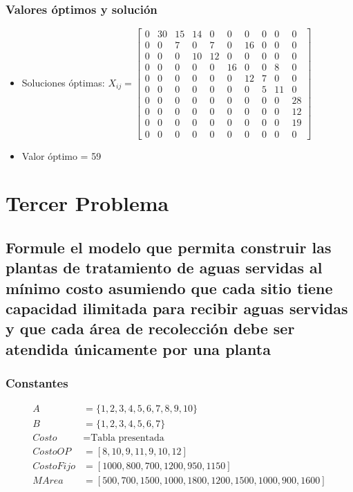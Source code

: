 \documentclass[a4paper,12pt]{article}
\begin{document}
\subsubsection{Valores óptimos y solución}
\begin{itemize}
	\item Soluciones óptimas: $X_{ij}=
	\begin{bmatrix}
		0 & 30 & 15 & 14 & 0 & 0 & 0 & 0 & 0 & 0\\
		0 & 0 & 7 & 0 & 7 & 0 & 16 & 0 & 0 & 0\\
		0 & 0 & 0 & 10 & 12 & 0 & 0 & 0 & 0 & 0\\
		0 & 0 & 0 & 0 & 0 & 16 & 0 & 0 & 8 & 0\\
		0 & 0 & 0 & 0 & 0 & 0 & 12 & 7 & 0 & 0\\
		0 & 0 & 0 & 0 & 0 & 0 & 0 & 5 & 11 & 0\\
		0 & 0 & 0 & 0 & 0 & 0 & 0 & 0 & 0 & 28\\
		0 & 0 & 0 & 0 & 0 & 0 & 0 & 0 & 0 & 12\\
		0 & 0 & 0 & 0 & 0 & 0 & 0 & 0 & 0 & 19\\
		0 & 0 & 0 & 0 & 0 & 0 & 0 & 0 & 0 & 0
	\end{bmatrix}$
	\item Valor óptimo = 59
\end{itemize}
\section{Tercer Problema}
\subsection{Formule  el  modelo  que  permita  construir  las  plantas de  tratamiento  de  aguas  servidas  al  mínimo  costo  asumiendo  que  cada  sitio  tiene  capacidad  ilimitada para  recibir  aguas  servidas  y  que  cada  área  de  recolección debe ser atendida únicamente por una planta}
\subsubsection{Constantes}
\begin{equation*}
\begin{split}
	A&=\{1,2,3,4,5,6,7,8,9,10\}\\
	B&=\{1,2,3,4,5,6,7\}\\
	Costo &= \text{Tabla presentada}\\
	CostoOP&=[8,10,9,11,9,10,12]\\
	CostoFijo&=[1000,800,700,1200,950,1150]\\
	MArea&=[500,700,1500,1000,1800,1200,1500,1000,900,1600]
\end{split}
\end{equation*}
\end{document}
